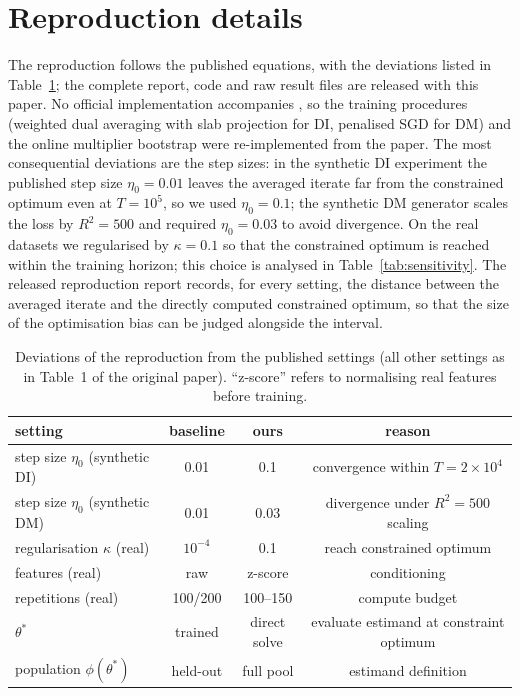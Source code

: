 \documentclass[pdflatex,sn-basic]{sn-jnl}
\begin{document}
\section{Reproduction details}
\label{app:repro}

The reproduction follows the published equations, with the deviations listed in
Table~\ref{tab:deviations}; the complete report, code and raw result files are released with this
paper.  No official implementation accompanies \citet{roy2026uq}, so the training procedures
(weighted dual averaging with slab projection for DI, penalised SGD for DM) and the online multiplier
bootstrap were re-implemented from the paper.  The most consequential deviations are the step sizes:
in the synthetic DI experiment the published step size $\eta_0=0.01$ leaves the averaged iterate far
from the constrained optimum even at $T=10^5$, so we used $\eta_0=0.1$; the synthetic DM generator
scales the loss by $R^2=500$ and required $\eta_0=0.03$ to avoid divergence.  On the real datasets we
regularised by $\kappa=0.1$ so that the constrained optimum is reached within the training horizon;
this choice is analysed in Table~\ref{tab:sensitivity}.  The released reproduction report records, for
every setting, the distance between the averaged iterate and the directly computed constrained
optimum, so that the size of the optimisation bias can be judged alongside the interval.

\begin{table}[t]
\centering
\footnotesize
\setlength{\tabcolsep}{4pt}
\caption{Deviations of the reproduction from the published settings (all other settings as in Table~1 of the original paper).  ``z-score'' refers to normalising real features before training.}
\label{tab:deviations}
\begin{tabular}{lccc}
\toprule
setting & baseline & ours & reason \\
\midrule
step size $\eta_0$ (synthetic DI) & 0.01 & 0.1 & convergence within $T=2\times10^4$ \\
step size $\eta_0$ (synthetic DM) & 0.01 & 0.03 & divergence under $R^2=500$ scaling \\
regularisation $\kappa$ (real) & $10^{-4}$ & 0.1 & reach constrained optimum \\
features (real) & raw & z-score & conditioning \\
repetitions (real) & 100/200 & 100--150 & compute budget \\
$\theta^*$ & trained & direct solve & evaluate estimand at constraint optimum \\
population $\phi(\theta^*)$ & held-out & full pool & estimand definition \\
\bottomrule
\end{tabular}
\end{table}



\end{document}
